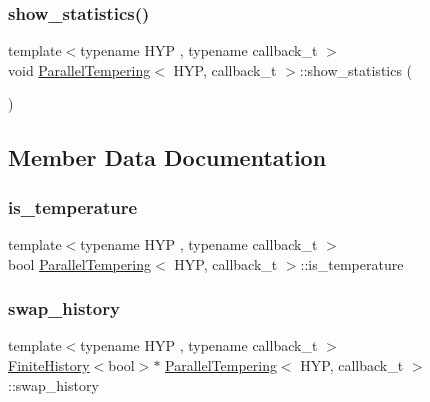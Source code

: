 \mbox{\label{class_parallel_tempering_a9e1960158b12a4dadfab54eb4fb895d3}} 
\subsubsection{\texorpdfstring{show\+\_\+statistics()}{show\_statistics()}}
{\footnotesize\ttfamily template$<$typename H\+YP , typename callback\+\_\+t $>$ \\
void \hyperlink{class_parallel_tempering}{Parallel\+Tempering}$<$ H\+YP, callback\+\_\+t $>$\+::show\+\_\+statistics (\begin{DoxyParamCaption}{ }\end{DoxyParamCaption})\hspace{0.3cm}{\ttfamily [inline]}}



\subsection{Member Data Documentation}
\mbox{\label{class_parallel_tempering_ae9f0a2af938df838cc4010983860394e}} 
\subsubsection{\texorpdfstring{is\+\_\+temperature}{is\_temperature}}
{\footnotesize\ttfamily template$<$typename H\+YP , typename callback\+\_\+t $>$ \\
bool \hyperlink{class_parallel_tempering}{Parallel\+Tempering}$<$ H\+YP, callback\+\_\+t $>$\+::is\+\_\+temperature}

\mbox{\label{class_parallel_tempering_af9ae9446ae4d22c0a26755f3d3a1d86a}} 
\subsubsection{\texorpdfstring{swap\+\_\+history}{swap\_history}}
{\footnotesize\ttfamily template$<$typename H\+YP , typename callback\+\_\+t $>$ \\
\hyperlink{class_finite_history}{Finite\+History}$<$bool$>$$\ast$ \hyperlink{class_parallel_tempering}{Parallel\+Tempering}$<$ H\+YP, callback\+\_\+t $>$\+::swap\+\_\+history}

